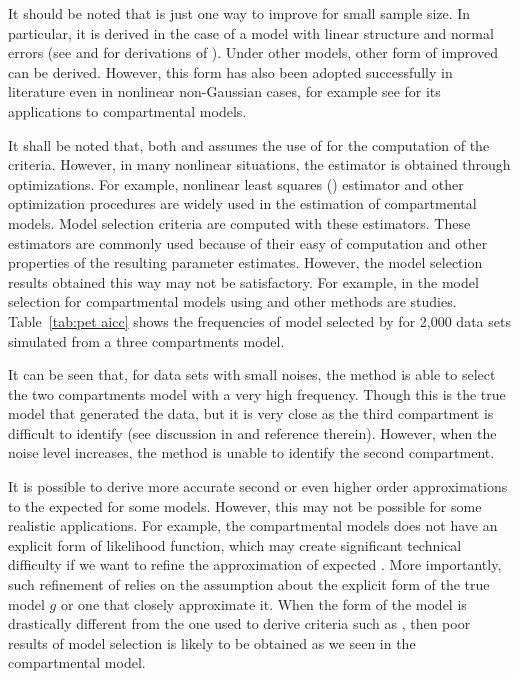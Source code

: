 It should be noted that \aicc is just one way to improve \aic for small sample
size. In particular, it is derived in the case of a model with linear
structure and normal errors (see \cite{Hurvich:1989ev} and
\cite[][sec.~6.4.1]{Burnham:2002wc} for derivations of \aicc). Under other
models, other form of improved \aic can be derived. However, this form has
also been adopted successfully in literature even in nonlinear non-Gaussian
cases, for example see \cite{Turkheimer:2003iy} for its applications to \pet
compartmental models.

It shall be noted that, both \aic and \aicc assumes the use of \mle for the
computation of the criteria. However, in many nonlinear situations, the
estimator is obtained through optimizations. For example, nonlinear least
squares (\nls) estimator and other optimization procedures are widely used in
the estimation of \pet compartmental models. Model selection criteria are
computed with these estimators. These estimators are commonly used because of
their easy of computation and other properties of the resulting parameter
estimates. However, the model selection results obtained this way may not be
satisfactory. For example, in \cite{Zhou2013} the model selection for \pet
compartmental models using \aic and other methods are studies.
Table~\ref{tab:pet aicc} shows the frequencies of model selected by \aicc for
2,000 data sets simulated from a three compartments model.



It can be seen that, for data sets with small noises, the \aicc method is able
to select the two compartments model with a very high frequency. Though this
is the true model that generated the data, but it is very close as the third
compartment is difficult to identify (see discussion in \cite{Zhou2013} and
reference therein). However, when the noise level increases, the method is
unable to identify the second compartment.

It is possible to derive more accurate second or even higher order
approximations to the expected \kld for some models. However, this may not be
possible for some realistic applications. For example, the \pet compartmental
models does not have an explicit form of likelihood function, which may create
significant technical difficulty if we want to refine the \aic approximation
of expected \kld. More importantly, such refinement of \aic relies on the
assumption about the explicit form of the true model $g$ or one that closely
approximate it. When the form of the model is drastically different from the
one used to derive criteria such as \aicc, then poor results of model
selection is likely to be obtained as we seen in the \pet compartmental model.

